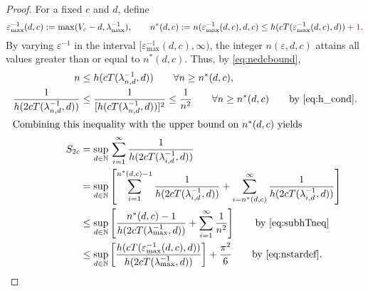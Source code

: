 \documentclass[11pt,a4paper]{article}
\newcommand{\peter}[1]{\begingroup\color{purple}#1\endgroup}
\begin{document}
\begin{proof}
For a fixed $c$ and $d$, define
\begin{equation} \label{eq:nstardef}
	\varepsilon^{-1}_{\max}(d,c) := \max(V_c - d,\lambda_{\max}^{-1}), \qquad n^*(d,c) : = n(\varepsilon^{-1}_{\max}(d,c),d,c) \le h(cT(\varepsilon^{-1}_{\max}(d,c),d)) \peter{+1}.
\end{equation} 
By varying $\varepsilon^{-1}$ in the interval $[\varepsilon^{-1}_{\max}(d,c),\infty)$,  the integer $n(\varepsilon,d,c)$ attains all values greater than or equal to $n^*(d,c)$.  Thus, by \eqref{eq:nedcbound},
\begin{align}
		n &\le h(cT(\lambda^{-1}_{n,d},d)) \qquad  \forall n \ge n^*(d,c), \label{eq:subhTneq}\\
		\nonumber
		\frac{1}{h(2 cT(\lambda^{-1}_{n,d},d)) } & \le \frac{1}{[h(cT(\lambda^{-1}_{n,d},d))]^{2}}  \le \frac 1{n^2}   \qquad  \forall n \ge n^*(d,c) \qquad \text{by \eqref{eq:h_cond}}. \\
		\intertext{Combining this inequality with the upper bound on $n^*(d,c)$ yields}
		\nonumber
		S_{2c} & =\sup_{d\in\mathbb{N}}  \, \sum_{i=1}^\infty \frac1{h(2cT(\lambda_{i,d}^{-1},d))} \\
		\nonumber
		&  = \sup_{d\in\mathbb{N}} \left [
		\sum_{i=1}^{n^*(d,c)-1} \frac1{h(2cT(\lambda_{i,d}^{-1},d))}
		+ \sum_{i=n^*(d,c)}^\infty \frac1{h(2cT(\lambda_{i,d}^{-1},d))} 
		\right]\\
		 \nonumber
		 & \le \sup_{d\in\mathbb{N}} \left [
\frac{n^*(d,c)-1}{h(2cT(\lambda_{\max}^{-1},d))}
+ \sum_{i=1}^\infty \frac1{n^2}
\right] 
 \qquad \text{by \eqref{eq:subhTneq}}\\ 
 \label{eq:lastone}
		 & \le \sup_{d\in\mathbb{N}} \left [
		 \frac{ h(cT(\varepsilon^{-1}_{\max}(d,c),d))}{h(2cT(\lambda_{\max}^{-1},d))}
		\right] + \frac{\pi^2}{6}
		\qquad \text{by \eqref{eq:nstardef}.}
\end{align}


\end{proof}
\end{document}
